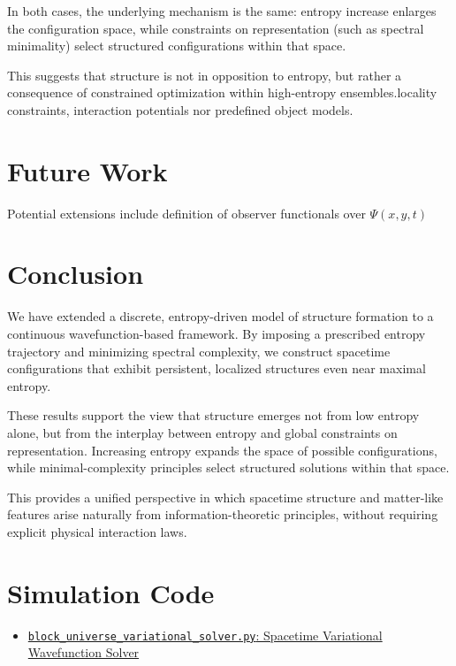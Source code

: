 \documentclass[11pt]{article}
\begin{document}
In both cases, the underlying mechanism is the same: entropy increase enlarges the configuration space, while constraints on representation (such as spectral minimality) select structured configurations within that space.

This suggests that structure is not in opposition to entropy, but rather a consequence of constrained optimization within high-entropy ensembles.locality constraints, interaction potentials nor predefined object models.


\section{Future Work}

Potential extensions include definition of observer functionals over $\Psi(x,y,t)$



\section{Conclusion}

We have extended a discrete, entropy-driven model of structure formation to a continuous wavefunction-based framework. By imposing a prescribed entropy trajectory and minimizing spectral complexity, we construct spacetime configurations that exhibit persistent, localized structures even near maximal entropy.

These results support the view that structure emerges not from low entropy alone, but from the interplay between entropy and global constraints on representation. Increasing entropy expands the space of possible configurations, while minimal-complexity principles select structured solutions within that space.

This provides a unified perspective in which spacetime structure and matter-like features arise naturally from information-theoretic principles, without requiring explicit physical interaction laws.



\section{Simulation Code}

\begin{itemize}
    \item \href{simulations/block_universe_variational_solver.py}{\texttt{block\_universe\_variational\_solver.py}: Spacetime Variational Wavefunction Solver}
\end{itemize}
   
\printbibliography
\end{document}
